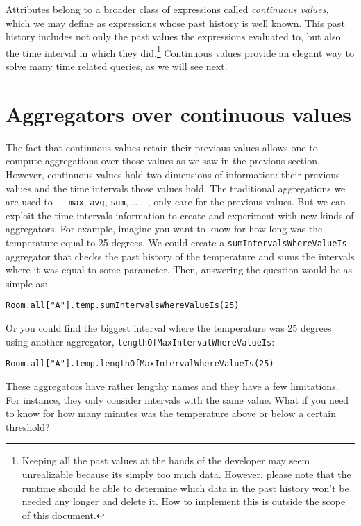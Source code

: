 \documentclass{report}
\begin{document}
Attributes belong to a broader class of expressions called
\emph{continuous values}, which we may define as expressions whose
past history is well known. This past history includes not only the
past values the expressions evaluated to, but also the time interval
in which they did.\footnote{Keeping all the past values at the hands
  of the developer may seem unrealizable because its simply too much
  data. However, please note that the runtime should be able to
  determine which data in the past history won't be needed any longer
  and delete it. How to implement this is outside the scope of this
  document.} Continuous values provide an elegant way to solve many
time related queries, as we will see next.

\section{Aggregators over continuous values}

The fact that continuous values retain their previous values allows
one to compute aggregations over those values as we saw in the
previous section. However, continuous values hold two dimensions of
information: their previous values and the time intervals those values
hold. The traditional aggregations we are used to --- \verb=max=,
\verb=avg=, \verb=sum=, \ldots ---, only care for the previous
values. But we can exploit the time intervals information to create
and experiment with new kinds of aggregators. For example, imagine you
want to know for how long was the temperature equal to 25 degrees. We
could create a \verb=sumIntervalsWhereValueIs= aggregator that checks
the past history of the temperature and sums the intervals where it
was equal to some parameter. Then, answering the question would be as
simple as:

\begin{verbatim}
Room.all["A"].temp.sumIntervalsWhereValueIs(25)
\end{verbatim}

Or you could find the biggest interval where the temperature was 25
degrees using another aggregator,
\verb=lengthOfMaxIntervalWhereValueIs=:

\begin{verbatim}
Room.all["A"].temp.lengthOfMaxIntervalWhereValueIs(25)
\end{verbatim}

These aggregators have rather lengthy names and they have a few
limitations. For instance, they only consider intervals with the same
value. What if you need to know for how many minutes was the
temperature above or below a certain threshold?
\end{document}
